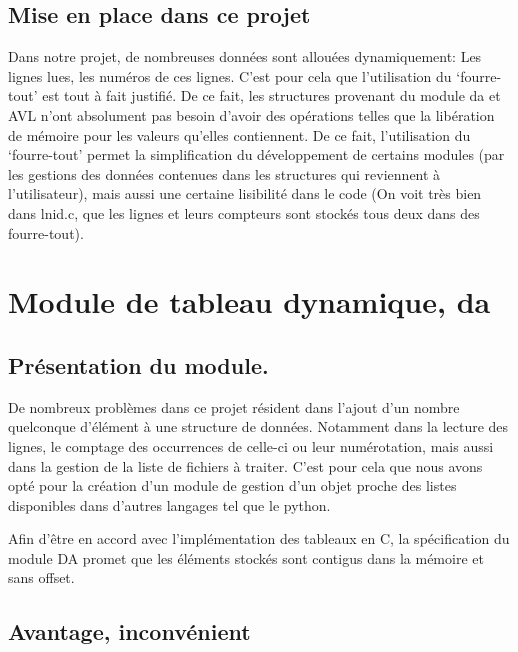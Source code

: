 \documentclass[12pt]{article}
\begin{document}
    \subsection{Mise en place dans ce projet}

    Dans notre projet, de nombreuses données sont allouées dynamiquement\@: Les 
    lignes lues, les numéros de ces lignes. C'est pour cela que l'utilisation du 
    `fourre-tout' est tout à fait justifié. De ce fait, les structures 
    provenant du module da et AVL n'ont absolument pas besoin d'avoir des
    opérations telles que la libération de mémoire pour les valeurs qu'elles 
    contiennent. De ce fait, l'utilisation du `fourre-tout' permet la 
    simplification du développement de certains modules (par les gestions des 
    données contenues dans les structures qui reviennent à l'utilisateur), mais 
    aussi une certaine lisibilité dans le code (On voit très bien dans lnid.c,
    que les lignes et leurs compteurs sont stockés tous deux dans des 
    fourre-tout).

    \newpage

    \section{Module de tableau dynamique, da}

    \subsection{Présentation du module.}

    De nombreux problèmes dans ce projet résident dans l'ajout d'un nombre 
    quelconque d'élément à une structure de données. Notamment dans la 
    lecture des lignes, le comptage des occurrences de celle-ci ou leur 
    numérotation, mais aussi dans la gestion de la liste de fichiers à 
    traiter. C'est pour cela que nous avons opté pour la création d'un 
    module de gestion d'un objet proche des listes disponibles dans d'autres 
    langages tel que le python. 

    Afin d'être en accord avec l'implémentation des tableaux en C, la 
    spécification du module DA promet que les éléments stockés sont 
    contigus dans la mémoire et sans offset.
    
    \subsection{Avantage, inconvénient}
\end{document}

